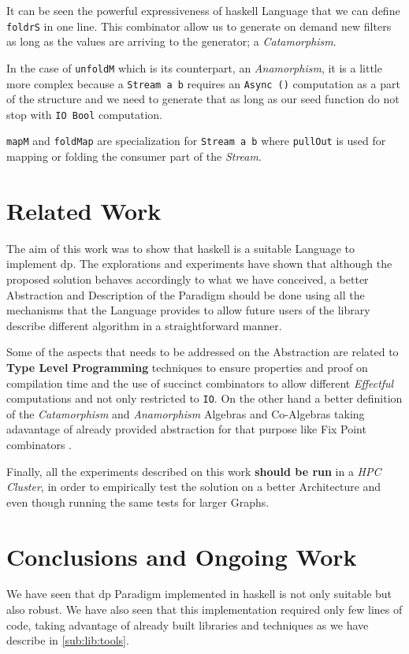\documentclass[preprint]{elsarticle}
\begin{document}
It can be seen the powerful expressiveness of \acrshort{haskell} Language that we can define \texttt{foldrS} in one line. This combinator allow us to generate on demand new filters as long as the values are arriving to the generator; a \textit{Catamorphism}.

In the case of \texttt{unfoldM} which is its counterpart, an \textit{Anamorphism}, it is a little more complex because a \texttt{Stream a b} 
requires an \texttt{Async ()} computation as a part of the structure and we need to generate that as long as our seed function do not stop with \texttt{IO Bool} computation.

\texttt{mapM} and \texttt{foldMap} are specialization for \texttt{Stream a b} where \texttt{pullOut} is used for mapping or folding the consumer part of the \textit{Stream}.


\section{Related Work}
The aim of this work was to show that \acrshort{haskell} is a suitable Language to implement \acrfull{dp}. The explorations and experiments have shown that although 
the proposed solution behaves accordingly to what we have conceived, a better Abstraction and Description of the Paradigm should be done using all the mechanisms that the Language provides 
to allow future users of the library describe different algorithm in a straightforward manner.

Some of the aspects that needs to be addressed on the Abstraction are related to \textbf{Type Level Programming} techniques to ensure properties and proof on compilation time and the use
of succinct combinators to allow different \emph{Effectful} computations and not only restricted to \texttt{IO}. On the other hand a better definition of the \textit{Catamorphism} and \textit{Anamorphism}
Algebras and Co-Algebras taking adavantage of already provided abstraction for that purpose like Fix Point combinators \citep{lenses}. 

Finally, all the experiments described on this work \textbf{should be run} in a \emph{HPC Cluster}, in order to empirically test the solution on a better Architecture and even though running the same tests for larger Graphs.

\section{Conclusions and Ongoing Work}
We have seen that \acrfull{dp} Paradigm implemented in \acrfull{haskell} is not only suitable but also robust. We have also seen that this implementation required only few lines of code, taking advantage of already built libraries and techniques as we have describe in \autoref{sub:lib:tools}.
\end{document}
